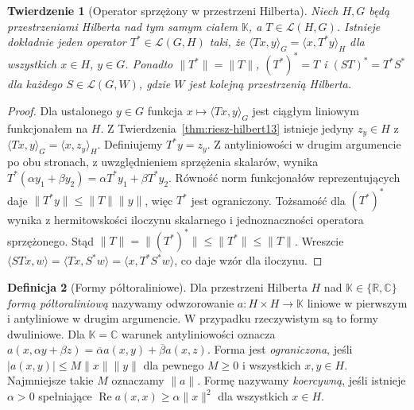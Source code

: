 \documentclass[11pt,a4paper]{article}
\numberwithin{equation}{section}
\theoremstyle{plain}
\newtheorem{twierdzenie}{Twierdzenie}[section]
\theoremstyle{definition}
\newtheorem{definicja}[twierdzenie]{Definicja}
\theoremstyle{remark}
\newcommand{\R}{\mathbb R}
\newcommand{\C}{\mathbb C}
\newcommand{\K}{\mathbb K}
\begin{document}
\begin{twierdzenie}[Operator sprzężony w przestrzeni Hilberta]
\label{thm:adjoint13}
Niech $H,G$ będą przestrzeniami Hilberta nad tym samym ciałem $\K$,
a $T\in\mathcal L(H,G)$. Istnieje dokładnie jeden operator
$T^*\in\mathcal L(G,H)$ taki, że
$\langle Tx,y\rangle_G=\langle x,T^*y\rangle_H$
dla wszystkich $x\in H$, $y\in G$.
Ponadto $\|T^*\|=\|T\|$, $(T^*)^*=T$ i
$(ST)^*=T^*S^*$ dla każdego $S\in\mathcal L(G,W)$,
gdzie $W$ jest kolejną przestrzenią Hilberta.
\end{twierdzenie}
\begin{proof}
Dla ustalonego $y\in G$ funkcja $x\mapsto\langle Tx,y\rangle_G$
jest ciągłym liniowym funkcjonałem na $H$. Z
Twierdzenia~\ref{thm:riesz-hilbert13} istnieje jedyny $z_y\in H$
z $\langle Tx,y\rangle_G=\langle x,z_y\rangle_H$.
Definiujemy $T^*y=z_y$. Z antyliniowości w drugim argumencie
po obu stronach, z uwzględnieniem sprzężenia skalarów, wynika
$T^*(\alpha y_1+\beta y_2)=\alpha T^*y_1+\beta T^*y_2$.
Równość norm funkcjonałów reprezentujących daje
$\|T^*y\|\le\|T\|\|y\|$, więc $T^*$ jest ograniczony.
Tożsamość dla $(T^*)^*$ wynika z hermitowskości iloczynu
skalarnego i jednoznaczności operatora sprzężonego.
Stąd $\|T\|=\|(T^*)^*\|\le\|T^*\|\le\|T\|$.
Wreszcie
$\langle STx,w\rangle=\langle Tx,S^*w\rangle
=\langle x,T^*S^*w\rangle$, co daje wzór dla iloczynu.
\end{proof}

\begin{definicja}[Formy półtoraliniowe]
\label{def:sesquilinear13}
Dla przestrzeni Hilberta $H$ nad $\K\in\{\R,\C\}$
\emph{formą półtoraliniową} nazywamy odwzorowanie
$a:H\times H\to\K$ liniowe w pierwszym i antyliniowe
w drugim argumencie. W przypadku rzeczywistym są to formy
dwuliniowe. Dla $\K=\C$ warunek antyliniowości oznacza
$a(x,\alpha y+\beta z)=\overline\alpha a(x,y)+\overline\beta a(x,z)$. Forma jest \emph{ograniczona}, jeśli
$|a(x,y)|\le M\|x\|\|y\|$ dla pewnego $M\ge0$ i wszystkich
$x,y\in H$. Najmniejsze takie $M$ oznaczamy $\|a\|$.
Formę nazywamy \emph{koercywną}, jeśli istnieje $\alpha>0$
spełniające $\operatorname{Re}a(x,x)\ge\alpha\|x\|^2$
dla wszystkich $x\in H$.
\end{definicja}
\end{document}
